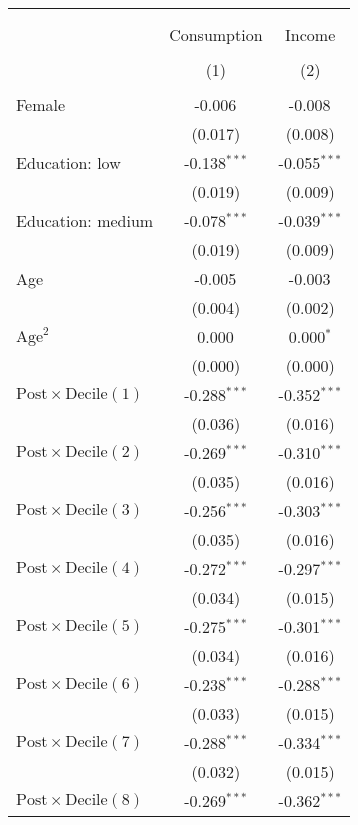 \centering
\begin{tabular}{@{\extracolsep{5pt}}lcc}
\\[-1.8ex]\hline
\hline \\[-1.8ex]
\\[-1.8ex] & \multicolumn{1}{c}{Consumption} & \multicolumn{1}{c}{Income}  \\
\\[-1.8ex] & (1) & (2) \\
\hline \\[-1.8ex]
 Female & -0.006$^{}$ & -0.008$^{}$ \\
& (0.017) & (0.008) \\
 Education: low & -0.138$^{***}$ & -0.055$^{***}$ \\
& (0.019) & (0.009) \\
 Education: medium & -0.078$^{***}$ & -0.039$^{***}$ \\
& (0.019) & (0.009) \\
 Age & -0.005$^{}$ & -0.003$^{}$ \\
& (0.004) & (0.002) \\
 $\text{Age}^2$ & 0.000$^{}$ & 0.000$^{*}$ \\
& (0.000) & (0.000) \\
 $\text{Post} \times \text{Decile}(1)$ & -0.288$^{***}$ & -0.352$^{***}$ \\
& (0.036) & (0.016) \\
 $\text{Post} \times \text{Decile}(2)$ & -0.269$^{***}$ & -0.310$^{***}$ \\
& (0.035) & (0.016) \\
 $\text{Post} \times \text{Decile}(3)$ & -0.256$^{***}$ & -0.303$^{***}$ \\
& (0.035) & (0.016) \\
 $\text{Post} \times \text{Decile}(4)$ & -0.272$^{***}$ & -0.297$^{***}$ \\
& (0.034) & (0.015) \\
 $\text{Post} \times \text{Decile}(5)$ & -0.275$^{***}$ & -0.301$^{***}$ \\
& (0.034) & (0.016) \\
 $\text{Post} \times \text{Decile}(6)$ & -0.238$^{***}$ & -0.288$^{***}$ \\
& (0.033) & (0.015) \\
 $\text{Post} \times \text{Decile}(7)$ & -0.288$^{***}$ & -0.334$^{***}$ \\
& (0.032) & (0.015) \\
 $\text{Post} \times \text{Decile}(8)$ & -0.269$^{***}$ & -0.362$^{***}$ \\

\end{tabular}
